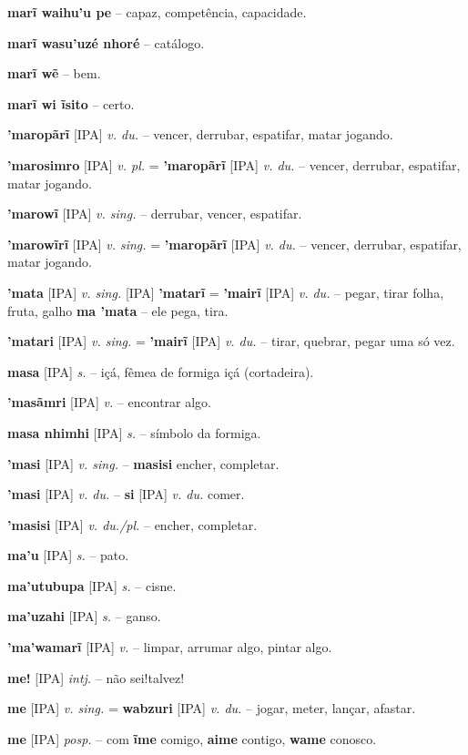 \textbf{marĩ waihu'u pe} -- capaz, competência, capacidade.

\textbf{marĩ wasu'uzé nhoré} -- catálogo.

\textbf{marĩ wẽ} -- bem.

\textbf{marĩ wi ĩsito} -- certo.

\textbf{'maropãrĩ} [IPA] \textit{v. du.} -- vencer, derrubar, espatifar, matar jogando.

\textbf{'marosimro} [IPA] \textit{v. pl.} = \textbf{'maropãrĩ} [IPA] \textit{v. du.} -- vencer, derrubar, espatifar, matar jogando.

\textbf{'marowĩ} [IPA] \textit{v. sing.} -- derrubar, vencer, espatifar.

\textbf{'marowĩrĩ} [IPA] \textit{v. sing.} = \textbf{'maropãrĩ} [IPA] \textit{v. du.} -- vencer, derrubar, espatifar, matar jogando.

\textbf{'mata} [IPA] \textit{v. sing.} [IPA] \textbf{'matarĩ} = \textbf{'mairĩ} [IPA] \textit{v. du.} -- pegar, tirar folha, fruta, galho  \textbf{ma 'mata} -- ele pega, tira.

\textbf{'matari} [IPA] \textit{v. sing.} = \textbf{'mairĩ} [IPA] \textit{v. du.} -- tirar, quebrar, pegar uma só vez.

\textbf{masa} [IPA] \textit{s.} -- içá, fêmea de formiga içá (cortadeira).

\textbf{'masãmri} [IPA] \textit{v.} -- encontrar algo.

\textbf{masa nhimhi} [IPA] \textit{s.} -- símbolo da formiga.

\textbf{'masi} [IPA] \textit{v. sing.} -- \textbf{masisi} encher, completar.

\textbf{'masi} [IPA] \textit{v. du.} -- \textbf{si} [IPA] \textit{v. du.} comer.

\textbf{'masisi} [IPA] \textit{v. du./pl.} -- encher, completar.

\textbf{ma'u} [IPA] \textit{s.} -- pato.

\textbf{ma'utubupa} [IPA] \textit{s.} -- cisne.

\textbf{ma'uzahi} [IPA] \textit{s.} -- ganso.

\textbf{'ma'wamarĩ} [IPA] \textit{v.} -- limpar, arrumar algo, pintar algo.

\textbf{me!} [IPA] \textit{intj.} -- não sei!talvez!

\textbf{me} [IPA] \textit{v. sing.} = \textbf{wabzuri} [IPA] \textit{v. du.} -- jogar, meter, lançar, afastar.

\textbf{me} [IPA] \textit{posp.} -- com  \textbf{ĩme} comigo, \textbf{aime} contigo, \textbf{wame} conosco.


